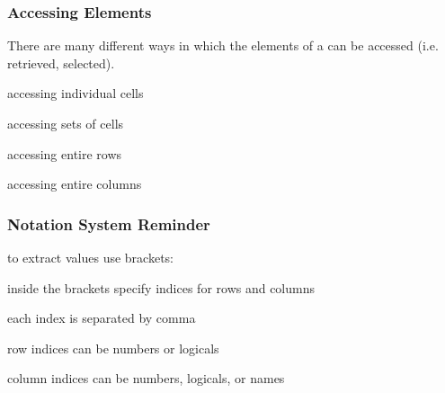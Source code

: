 \documentclass[12pt]{beamer}\usepackage[]{graphicx}\usepackage[]{color}
\begin{document}

\begin{frame}
\begin{center}
\Huge{}
\end{center}
\end{frame}


\begin{frame}
\frametitle{Accessing Elements}

There are many different ways in which the elements of a  can be accessed (i.e. retrieved, selected).

\bi
  \item accessing individual cells
  \item accessing sets of cells
  \item accessing entire rows
  \item accessing entire columns
\ei

\end{frame}


\begin{frame}
\frametitle{Notation System Reminder}

\bbi
  \item to extract values use brackets: \code{[ ]}
  \item inside the brackets specify indices for rows and columns
  \item each index is separated by comma
  \item row indices can be numbers or logicals
  \item column indices can be numbers, logicals, or names
\ei
\eb
\end{frame}

\end{document}
